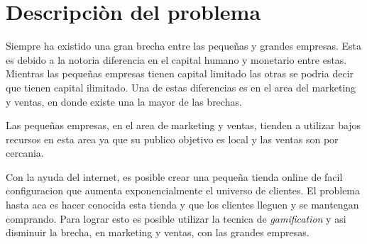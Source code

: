 \section{Descripciòn del problema}

Siempre ha existido una gran brecha entre las pequeñas y grandes empresas. Esta es debido a la notoria
diferencia en el capital humano y monetario entre estas. Mientras las pequeñas empresas tienen capital 
limitado las otras se podria decir que tienen capital ilimitado. Una de estas diferencias es en el area 
del marketing y ventas, en donde existe una la mayor de las brechas.

Las pequeñas empresas, en el area de marketing y ventas, tienden a utilizar bajos recursos en esta area 
ya que su publico objetivo es local y las ventas son por cercania.

Con la ayuda del internet, es posible crear una pequeña tienda online de facil configuracion que aumenta
exponencialmente el universo de clientes. El problema hasta aca es hacer conocida esta tienda y que los 
clientes lleguen y se mantengan comprando. Para lograr esto es posible utilizar la tecnica de
 \emph{gamification} y asi disminuir la brecha, en marketing y ventas, con las grandes empresas.


